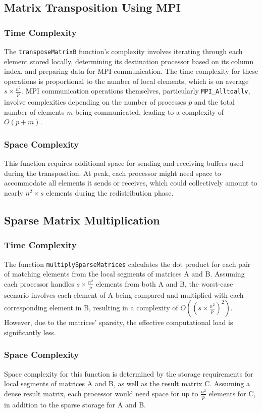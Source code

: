 \documentclass{article}
\begin{document}
\subsection{Matrix Transposition Using MPI}

\subsubsection{Time Complexity}
The \texttt{transposeMatrixB} function's complexity involves iterating through each element stored locally, determining its destination processor based on its column index, and preparing data for MPI communication. The time complexity for these operations is proportional to the number of local elements, which is on average \(s \times \frac{n^2}{p}\). MPI communication operations themselves, particularly \texttt{MPI\_Alltoallv}, involve complexities depending on the number of processes \(p\) and the total number of elements \(m\) being communicated, leading to a complexity of \(O(p + m)\).

\subsubsection{Space Complexity}
This function requires additional space for sending and receiving buffers used during the transposition. At peak, each processor might need space to accommodate all elements it sends or receives, which could collectively amount to nearly \(n^2 \times s\) elements during the redistribution phase.

\subsection{Sparse Matrix Multiplication}

\subsubsection{Time Complexity}
The function \texttt{multiplySparseMatrices} calculates the dot product for each pair of matching elements from the local segments of matrices A and B. Assuming each processor handles \(s \times \frac{n^2}{p}\) elements from both A and B, the worst-case scenario involves each element of A being compared and multiplied with each corresponding element in B, resulting in a complexity of \(O((s \times \frac{n^2}{p})^2)\). However, due to the matrices' sparsity, the effective computational load is significantly less.

\subsubsection{Space Complexity}
Space complexity for this function is determined by the storage requirements for local segments of matrices A and B, as well as the result matrix C. Assuming a dense result matrix, each processor would need space for up to \(\frac{n^2}{p}\) elements for C, in addition to the sparse storage for A and B.
\end{document}
